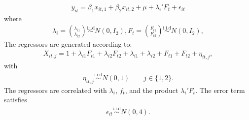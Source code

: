 \documentclass[a4paper,11pt,english]{sphinxmanual}
\begin{document}
\begin{fulllineitems}
\begin{description}
\end{description}
\begin{equation*}
\begin{split}y_{it} = \beta_{1}x_{it,1}+\beta_{2}x_{it,2}+\mu+\lambda_{i}'F_{t}+\epsilon_{it}\end{split}
\end{equation*}
\sphinxAtStartPar
where
\begin{equation*}
\begin{split}\lambda_i = \binom{\lambda_{i1}}{\lambda_{i2}} \stackrel{\text{i.i.d}}{\sim}
N(0,I_2),
F_t =\binom{F_{t1}}{F_{t2}}\stackrel{\text{i.i.d}}{\sim}  N(0,I_2),\end{split}
\end{equation*}
\sphinxAtStartPar
The regressors are generated according to:
\begin{equation*}
\begin{split}X_{it,j}= 1+\lambda_{i1}F_{t1}+\lambda_{i2}F_{t2}+\lambda_{i1}+\lambda_{i2}+
F_{t1}+F_{t2}+\eta_{it,j},\end{split}
\end{equation*}
\sphinxAtStartPar
with
\begin{equation*}
\begin{split}\eta_{it,j}\stackrel{\text{i.i.d}}{\sim} N(0,1) \qquad j\in \{1,2\}.\end{split}
\end{equation*}
\sphinxAtStartPar
The regressors are correlated with \(\lambda_i\), \(f_t\), and the product
\(\lambda_i' F_t\).
The error term satisfies
\begin{equation*}
\begin{split}\epsilon_{it} \stackrel{\text{i.i.d}}{\sim}N(0,4).\end{split}
\end{equation*}
\end{fulllineitems}

\end{document}

